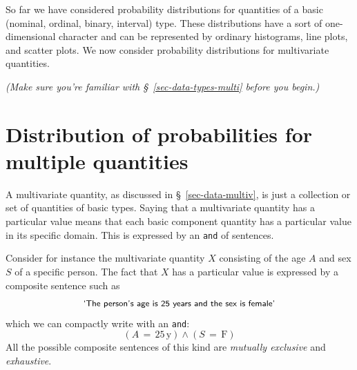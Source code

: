 \documentclass[
  a4paper,
  DIV=11,
  numbers=noendperiod,
  oneside]{scrreprt}
\begin{document}
\providecommand{\ul}{\uline}
\renewcommand*{\|}[1][]{\nonscript\:#1\vert\nonscript\:\mathopen{}}
\providecommand*{\pr}[1]{\textsf{\small`#1'}}
\renewcommand*{\pr}[1]{\textsf{\small`#1'}}
\providecommand*{\prq}[1]{\textsf{\small #1}}

\providecommand{\se}[1]{\mathsfit{#1}}
\renewcommand{\se}[1]{\mathsfit{#1}}
\providecommand{\p}{\mathrm{p}}
\renewcommand{\p}{\mathrm{p}}
\renewcommand{\P}{\mathrm{P}}

\providecommand*{\mo}[1][=]{\mathord{\,#1\,}}
\providecommand*{\yX}{\se{X}}
\providecommand*{\yY}{\se{Y}}
\providecommand*{\yI}{\se{I}}
\providecommand{\di}{\mathrm{d}}

So far we have considered probability distributions for quantities of a
basic (nominal, ordinal, binary, interval) type. These distributions
have a sort of one-dimensional character and can be represented by
ordinary histograms, line plots, and scatter plots. We now consider
probability distributions for multivariate quantities.

{\emph{(Make sure you're familiar with §~\ref{sec-data-types-multi}
before you begin.)}}

\hypertarget{distribution-of-probabilities-for-multiple-quantities}{%
\section{Distribution of probabilities for multiple
quantities}\label{distribution-of-probabilities-for-multiple-quantities}}

A multivariate quantity, as discussed in §~\ref{sec-data-multiv}, is
just a collection or set of quantities of basic types. Saying that a
multivariate quantity has a particular value means that each basic
component quantity has a particular value in its specific domain. This
is expressed by an \texttt{and} of sentences.

Consider for instance the multivariate quantity \(X\) consisting of the
age \(A\) and sex \(S\) of a specific person. The fact that \(X\) has a
particular value is expressed by a composite sentence such as \[
\textsf{\small`The person's age is 25 years and the sex is female'}
\] which we can compactly write with an \texttt{and}: \[
(A\mathord{\,=\,}25\,\mathrm{y}) \land (S\mathord{\,=\,}\mathrm{F})
\] All the possible composite sentences of this kind are \emph{mutually
exclusive} and \emph{exhaustive}.
\end{document}
